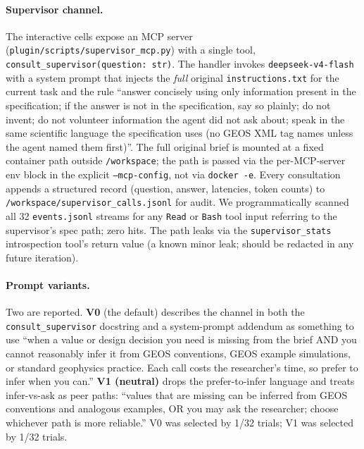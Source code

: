 \documentclass{article}
\begin{document}
\paragraph{Supervisor channel.} The interactive cells expose an MCP server (\texttt{plugin/scripts/supervisor\_mcp.py}) with a single tool, \texttt{consult\_supervisor(question: str)}. The handler invokes \texttt{deepseek-v4-flash} with a system prompt that injects the \emph{full} original \texttt{instructions.txt} for the current task and the rule ``answer concisely using only information present in the specification; if the answer is not in the specification, say so plainly; do not invent; do not volunteer information the agent did not ask about; speak in the same scientific language the specification uses (no GEOS XML tag names unless the agent named them first)''. The full original brief is mounted at a fixed container path outside \texttt{/workspace}; the path is passed via the per-MCP-server env block in the explicit \texttt{--mcp-config}, not via \texttt{docker -e}. Every consultation appends a structured record (question, answer, latencies, token counts) to \texttt{/workspace/supervisor\_calls.jsonl} for audit. We programmatically scanned all 32 \texttt{events.jsonl} streams for any \texttt{Read} or \texttt{Bash} tool input referring to the supervisor's spec path; zero hits. The path leaks via the \texttt{supervisor\_stats} introspection tool's return value (a known minor leak; should be redacted in any future iteration).

\paragraph{Prompt variants.} Two are reported. \textbf{V0} (the default) describes the channel in both the \texttt{consult\_supervisor} docstring and a system-prompt addendum as something to use ``when a value or design decision you need is missing from the brief AND you cannot reasonably infer it from GEOS conventions, GEOS example simulations, or standard geophysics practice. Each call costs the researcher's time, so prefer to infer when you can.'' \textbf{V1 (neutral)} drops the prefer-to-infer language and treats infer-vs-ask as peer paths: ``values that are missing can be inferred from GEOS conventions and analogous examples, OR you may ask the researcher; choose whichever path is more reliable.'' V0 was selected by 1/32 trials; V1 was selected by 1/32 trials.
\end{document}
